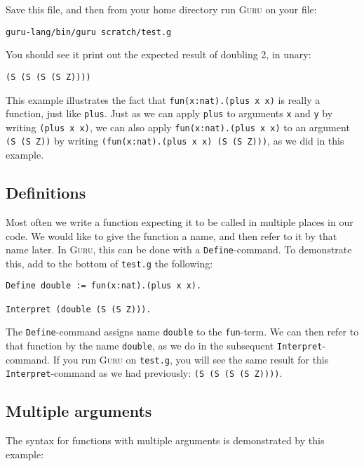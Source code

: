 \documentclass{book}[12pt]
\newcommand{\guru}[0]{\textsc{Guru}\xspace}
\begin{document}
\noindent Save this file, and then from your home directory run
\guru on your file:

\begin{verbatim}
guru-lang/bin/guru scratch/test.g
\end{verbatim}

\noindent You should see it print out the expected result of doubling
2, in unary:

\begin{verbatim}
(S (S (S (S Z))))
\end{verbatim}

\noindent This example illustrates the fact that
\texttt{fun(x:nat).(plus x x)} is really a function, just like
\texttt{plus}.  Just as we can apply \texttt{plus} to arguments
\texttt{x} and \texttt{y} by writing \texttt{(plus x x)}, we can also
apply \texttt{fun(x:nat).(plus x x)} to an argument \texttt{(S (S Z))}
by writing \texttt{(fun(x:nat).(plus x x) (S (S Z)))}, as we did in
this example.

\subsection{Definitions}

Most often we write a function expecting it to be called in multiple
places in our code.  We would like to give the function a name, and
then refer to it by that name later.  In \textsc{Guru}, this can be
done with a \texttt{Define}-command. To demonstrate this, add to the
bottom of \texttt{test.g} the following:

\begin{verbatim}
Define double := fun(x:nat).(plus x x).

Interpret (double (S (S Z))).
\end{verbatim}

\noindent The \texttt{Define}-command assigns name \texttt{double} to
the \texttt{fun}-term.  We can then refer to that function by
the name \texttt{double}, as we do in the subsequent
\texttt{Interpret}-command.  If you run \guru on \texttt{test.g},
you will see the same result for this \texttt{Interpret}-command
as we had previously: \texttt{(S (S (S (S Z))))}.

\subsection{Multiple arguments}

The syntax for functions with multiple arguments is demonstrated
by this example:
\end{document}
